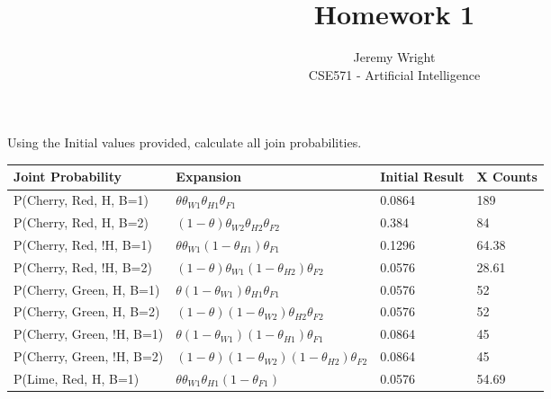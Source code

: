 \documentclass[12pt]{article}
\newenvironment{problem}[2][Problem]{\begin{trivlist}
\item[\hskip \labelsep {\bfseries #1}\hskip \labelsep {\bfseries #2.}]}{\end{trivlist}}
\begin{document}
 
 
\title{Homework 1}%
\author{Jeremy Wright\\ %
CSE571 - Artificial Intelligence} %
 
\maketitle
\begin{problem}{1}
 
Using the Initial values provided, calculate all join probabilities.

\begin{tabular}{|l|l|l|l|}
        \hline
        Joint Probability & Expansion  & Initial Result & X Counts\\
        \hline
        \hline
        P(Cherry, Red, H, B=1)    & $ \theta \theta_{W1} \theta_{H1} \theta_{F1}$                             & 0.0864 & 189\\ \hline
        P(Cherry, Red, H, B=2)    & $ (1-\theta) \theta_{W2} \theta_{H2}       \theta_{F2}$                   & 0.384  & 84\\ \hline
        P(Cherry, Red, !H, B=1)   & $ \theta \theta_{W1} (1-\theta_{H1})       \theta_{F1}$                   & 0.1296 & 64.38\\ \hline
        P(Cherry, Red, !H, B=2)   & $ (1-\theta) \theta_{W1} (1-\theta_{H2})       \theta_{F2}$               & 0.0576 & 28.61\\ \hline
        P(Cherry, Green, H, B=1)  & $ \theta (1-\theta_{W1}) \theta_{H1}       \theta_{F1}$                   & 0.0576 & 52\\ \hline
        P(Cherry, Green, H, B=2)  & $ (1-\theta) (1-\theta_{W2}) \theta_{H2}       \theta_{F2}$               & 0.0576 & 52\\ \hline
        P(Cherry, Green, !H, B=1) & $ \theta (1-\theta_{W1}) (1-\theta_{H1})       \theta_{F1}$               & 0.0864 & 45\\ \hline
        P(Cherry, Green, !H, B=2) & $ (1-\theta) (1-\theta_{W2}) (1-\theta_{H2})       \theta_{F2}$           & 0.0864 & 45\\ \hline
        P(Lime, Red, H, B=1)      & $ \theta \theta_{W1} \theta_{H1}      (1-\theta_{F1})$                    & 0.0576 & 54.69\\ \hline

\end{tabular}
\end{problem}
\end{document}
